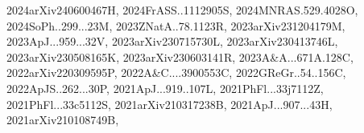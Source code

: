 \documentclass[12pt]{article}
\begin{document}
{2024arXiv240600467H,%
2024FrASS..1112905S,%
2024MNRAS.529.4028O,%
2024SoPh..299...23M,%
2023ZNatA..78.1123R,%
2023arXiv231204179M,%
2023ApJ...959...32V,%
2023arXiv230715730L,%
2023arXiv230413746L,%
2023arXiv230508165K,%
2023arXiv230603141R,%
2023A&A...671A.128C,%
2022arXiv220309595P,%
2022A&C....3900553C,%
2022GReGr..54..156C,%
2022ApJS..262...30P,%
2021ApJ...919..107L,%
2021PhFl...33j7112Z,%
2021PhFl...33c5112S,%
2021arXiv210317238B,%
2021ApJ...907...43H,%
2021arXiv210108749B,%
}
\end{document}
